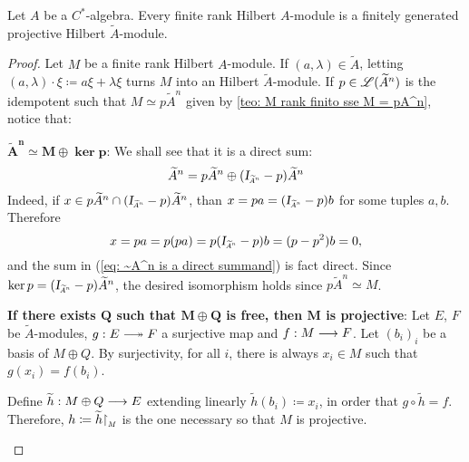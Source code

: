 \begin{proposicao}\label{prop: M eh finitamente gerado projetivo}
    Let $A$ be a $C^*$-algebra. Every finite rank Hilbert $A$-module is a finitely generated projective Hilbert $\widetilde A$-module.
\begin{proof}
Let $M$ be a finite rank Hilbert $A$-module. If $(a,\lambda) \in \widetilde A$, letting $(a,\lambda)\cdot \xi \coloneqq a\xi + \lambda\xi$ turns $M$ into an Hilbert $\widetilde A$-module. If $p\in \mathscr L({\widetilde{A}}^n)$ is the idempotent such that $M \simeq p{\widetilde{A}}^n$ given by \ref{teo: M rank finito sse M = pA^n}, notice that:
\begin{itroman}
    \item \ensuremath{\boldsymbol{{\widetilde{A}}^n \simeq M \oplus \ker p}}:  We shall see that it is a direct sum:
    \begin{equation}
    \label{eq: ~A^n is a direct summand}
        {{\widetilde{A}}}^n = p{{\widetilde{A}}}^n \oplus (\sub\Id{{\widetilde{A}}^n}-p){{\widetilde{A}}}^n
    \end{equation}
    Indeed, if $x \in p{\widetilde{A}}^n \cap (\sub\Id{{\widetilde{A}}^n}-p){{\widetilde{A}}}^n$, than $x = pa = (\sub\Id{{\widetilde{A}}^n}-p)b$ for some tuples $a, b$. Therefore
    \[
    x = pa = p(pa) = p(\sub\Id{{{\widetilde{A}}}^n}-p)b = (p - p^2)b = 0,
    \]
    and the sum in (\ref{eq: ~A^n is a direct summand}) is fact direct. Since $\ker p = (\sub\Id{{\widetilde{A}}^n}-p){\widetilde{A}}^n$, the desired isomorphism holds since $p\widetilde{A}^n \simeq M$.
    \item \label{item: M projetivo sse M oplus Q livre}\textbf{If there exists $\boldsymbol Q$ such that $\boldsymbol{M\oplus Q}$ is free, then $\boldsymbol M$ is projective}: Let $E$, $F$ be $\widetilde A$-modules, $g:E \longtwoheadrightarrow F$ a surjective map and $f:M \longrightarrow F$. Let $(b_i)_i$ be a basis of $M\oplus Q$. By surjectivity, for all $i$, there is always $x_i\in M$  such that $g(x_i) = f(b_i)$. 
    
    Define $\widetilde{h}:M\oplus Q \longrightarrow E$ extending linearly $\widetilde{h}(b_i) \coloneqq x_i$, in order that $g \circ \widetilde{h} = f$. Therefore, $h \coloneqq \widetilde{h} \sub{\restrita}{M}$ is the one necessary so that $M$ is projective.
    

\end{itroman}
\end{proof}
\end{proposicao}
